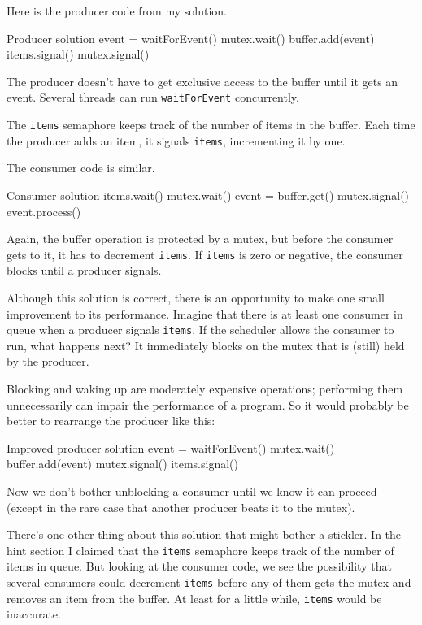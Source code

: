 
Here is the producer code from my solution.

\begin{lstbox}{Producer solution}
event = waitForEvent()
mutex.wait()
    buffer.add(event)
    items.signal()
mutex.signal()
\end{lstbox}

The producer doesn't have to get exclusive access to the buffer
until it gets an event.  Several threads can run {\tt waitForEvent}
concurrently.

The {\tt items} semaphore keeps track of the
number of items in the buffer.  Each time the producer adds an
item, it signals {\tt items}, incrementing it by one.

The consumer code is similar.

\begin{lstbox}{Consumer solution}
items.wait()
mutex.wait()
    event = buffer.get()
mutex.signal()
event.process()
\end{lstbox}

Again, the buffer operation is protected by a mutex,
but before the consumer gets to it, it has to decrement
{\tt items}.  If {\tt items} is zero or negative, the
consumer blocks until a producer signals.

Although this solution is correct, there is an opportunity
to make one small improvement to its performance.  Imagine
that there is at least one consumer in queue when a producer
signals {\tt items}.  If the scheduler allows the consumer
to run, what happens next?  It immediately blocks on the
mutex that is (still) held by the producer.

Blocking and waking up are moderately expensive operations;
performing them unnecessarily can impair the performance of
a program.  So it would probably be better to rearrange the
producer like this:

\begin{lstbox}{Improved producer solution}
event = waitForEvent()
mutex.wait()
    buffer.add(event)
mutex.signal()
items.signal()
\end{lstbox}

Now we don't bother unblocking a consumer until we know it can proceed
(except in the rare case that another producer beats it to the mutex).

There's one other thing about this solution that might bother
a stickler.  In the hint section I claimed that the {\tt items}
semaphore keeps track of the number of items in queue.  But looking
at the consumer code, we see the possibility that several consumers
could decrement {\tt items} before any of them gets the mutex
and removes an item from the buffer.  At least for a little while,
{\tt items} would be inaccurate.

